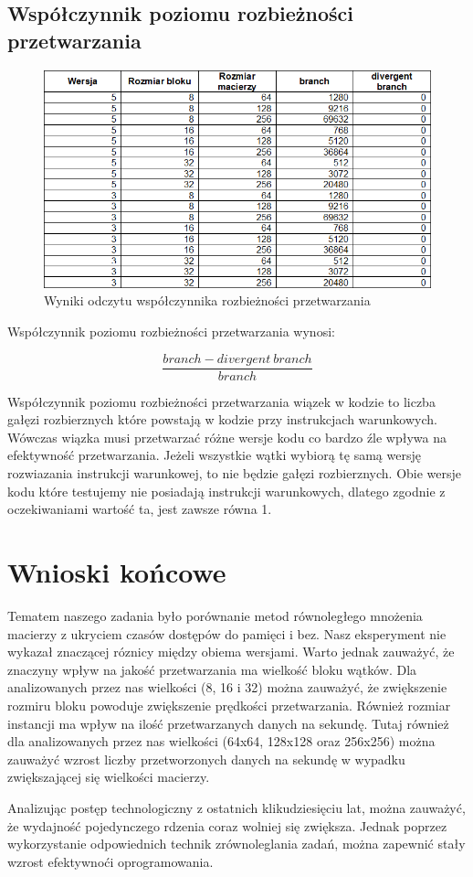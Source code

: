 \documentclass{article}
\begin{document}
\subsection{Współczynnik poziomu rozbieżności przetwarzania}

\begin{figure}[H]
	\centering
	\includegraphics[width=\linewidth]{./images/tables/table3.png}
	\caption{Wyniki odczytu współczynnika rozbieżności przetwarzania}
	\label{fig:table3}
\end{figure}

Współczynnik poziomu rozbieżności przetwarzania wynosi:

\[
\frac{branch - divergent\ branch}{branch}
\]

Współczynnik poziomu rozbieżności przetwarzania wiązek w kodzie to liczba gałęzi rozbierznych które powstają w kodzie przy instrukcjach warunkowych. Wówczas wiązka musi przetwarzać różne wersje kodu co bardzo źle wpływa na efektywność przetwarzania. Jeżeli wszystkie wątki wybiorą tę samą wersję rozwiazania instrukcji warunkowej, to nie będzie gałęzi rozbierznych. Obie wersje kodu które testujemy nie posiadają instrukcji warunkowych, dlatego zgodnie z oczekiwaniami wartość ta, jest zawsze równa 1.

\section{Wnioski końcowe}
Tematem naszego zadania było porównanie metod równoległego mnożenia macierzy z ukryciem czasów dostępów do pamięci i bez. Nasz eksperyment nie wykazał znaczącej róznicy między obiema wersjami. Warto jednak zauważyć, że znaczyny wpływ na jakość przetwarzania ma wielkość bloku wątków. Dla analizowanych przez nas wielkości (8, 16 i 32) można zauważyć, że zwiększenie rozmiru bloku powoduje zwiększenie prędkości przetwarzania. Również rozmiar instancji ma wpływ na ilość przetwarzanych danych na sekundę. Tutaj również dla analizowanych przez nas wielkości (64x64, 128x128 oraz 256x256) można zauważyć wzrost liczby przetworzonych danych na sekundę w wypadku zwiększającej się wielkości macierzy.

Analizując postęp technologiczny z ostatnich klikudziesięciu lat, można zauważyć, że wydajność pojedynczego rdzenia coraz wolniej się zwiększa. Jednak poprzez wykorzystanie odpowiednich technik zrównoleglania zadań, można zapewnić stały wzrost efektywnoći oprogramowania.
\end{document}
